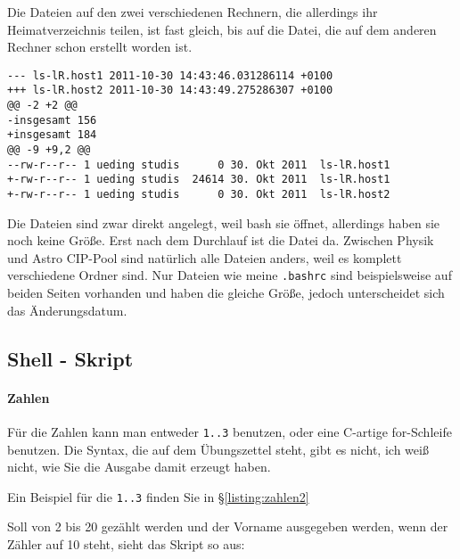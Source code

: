 \documentclass[12pt]{article}
\begin{document}
Die Dateien auf den zwei verschiedenen Rechnern, die allerdings ihr Heimatverzeichnis teilen, ist fast gleich, bis auf die Datei, die auf dem anderen Rechner schon erstellt worden ist.

\begin{lstlisting}[caption=Unterschied zwischen Ordnerinhalten]
--- ls-lR.host1 2011-10-30 14:43:46.031286114 +0100
+++ ls-lR.host2 2011-10-30 14:43:49.275286307 +0100
@@ -2 +2 @@
-insgesamt 156
+insgesamt 184
@@ -9 +9,2 @@
--rw-r--r-- 1 ueding studis      0 30. Okt 2011  ls-lR.host1
+-rw-r--r-- 1 ueding studis  24614 30. Okt 2011  ls-lR.host1
+-rw-r--r-- 1 ueding studis      0 30. Okt 2011  ls-lR.host2
\end{lstlisting}

Die Dateien sind zwar direkt angelegt, weil bash sie öffnet, allerdings haben sie noch keine Größe. Erst nach dem Durchlauf ist die Datei da. Zwischen Physik und Astro CIP-Pool sind natürlich alle Dateien anders, weil es komplett verschiedene Ordner sind. Nur Dateien wie meine \texttt{.bashrc} sind beispielsweise auf beiden Seiten vorhanden und haben die gleiche Größe, jedoch unterscheidet sich das Änderungsdatum.


\subsection{Shell - Skript}

\lstset{language=bash}





\paragraph{Zahlen}

Für die Zahlen kann man entweder \texttt{{1..3}} benutzen, oder eine C-artige for-Schleife benutzen. Die Syntax, die auf dem Übungszettel steht, gibt es nicht, ich weiß nicht, wie Sie die Ausgabe damit erzeugt haben.

\lstset{language=bash}




Ein Beispiel für die \texttt{{1..3}} finden Sie in §\ref{listing:zahlen2}

Soll von 2 bis 20 gezählt werden und der Vorname ausgegeben werden, wenn der Zähler auf 10 steht, sieht das Skript so aus:
\end{document}
